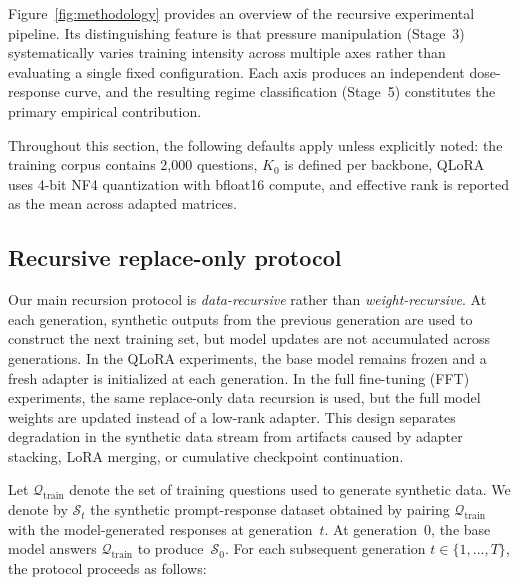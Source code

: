 \documentclass[a4paper,fleqn]{cas-dc}
\begin{document}
Figure~\ref{fig:methodology} provides an overview of the recursive experimental
pipeline. Its distinguishing feature is that pressure manipulation (Stage~3)
systematically varies training intensity across multiple axes rather than
evaluating a single fixed configuration. Each axis produces an independent
dose-response curve, and the resulting regime classification (Stage~5)
constitutes the primary empirical contribution.

Throughout this section, the following defaults apply unless explicitly noted:
the training corpus contains 2{,}000 questions, $K_0$ is defined per backbone,
QLoRA uses 4-bit NF4 quantization with bfloat16 compute, and effective rank is
reported as the mean across adapted matrices.

\subsection{Recursive replace-only protocol}\label{sec:protocol}

Our main recursion protocol is \textit{data-recursive} rather than
\textit{weight-recursive}. At each generation, synthetic outputs from the
previous generation are used to construct the next training set, but model
updates are not accumulated across generations. In the QLoRA experiments, the base model remains
frozen and a fresh adapter is initialized at each generation. In the full
fine-tuning (FFT) experiments, the same replace-only data recursion is used, but
the full model weights are updated instead of a low-rank adapter. This design
separates degradation in the synthetic data stream from artifacts caused by
adapter stacking, LoRA merging, or cumulative checkpoint continuation.

Let $\mathcal{Q}_{\mathrm{train}}$ denote the set of training questions used to
generate synthetic data. We denote by $\mathcal{S}_t$ the synthetic
prompt-response dataset obtained by pairing
$\mathcal{Q}_{\mathrm{train}}$ with the model-generated responses at
generation~$t$. At generation~0, the base model answers
$\mathcal{Q}_{\mathrm{train}}$ to produce~$\mathcal{S}_0$. For each subsequent
generation $t \in \{1,\ldots,T\}$, the protocol proceeds as follows:
\end{document}
